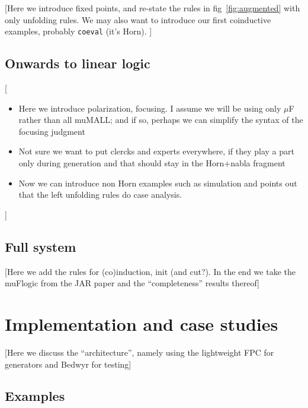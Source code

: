 \documentclass[a4paper]{easychair}
\begin{document}
\begin{center}
  [Here we introduce fixed points, and re-state the rules in fig~\ref{fig:augmented} with only unfolding rules. We may also want to introduce our first coinductive examples, probably \texttt{coeval} (it's Horn). 
  ]
\end{center}

\subsection{Onwards to linear logic}
\label{ssec:ll}

\begin{center}
  [
  \begin{itemize}
  \item Here we introduce polarization, focusing. I assume we will be
    using only $\mu$F rather than all muMALL; and if so, perhaps we
    can simplify the syntax of the focusing judgment
  \item Not sure we want to put clercks and experts everywhere, if they play a part only during generation and that should stay in the Horn+nabla fragment
  \item Now we can introduce non Horn examples such as simulation and points out that the left unfolding rules do case analysis.
\end{itemize}
  ]
\end{center}

\subsection{Full system}
\label{ssec:fullmumall}

\begin{center}
  [Here we add the rules for (co)induction, init (and cut?). In the end we take the muFlogic from the JAR paper and the ``completeness'' results thereof]
\end{center}

\section{Implementation and case studies}
\label{sec:case}

\begin{center}
  [Here we discuss the ``architecture'', namely using the lightweight FPC for generators and Bedwyr for testing]
\end{center}  
\subsection{Examples}
\label{ssec:exs}
\end{document}
